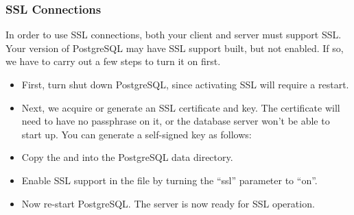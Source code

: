 \documentclass[a4paper,11pt,english]{sphinxmanual}
\begin{document}
\subsubsection{SSL Connections}
\label{\detokenize{maintenance:id1}}
In order to use SSL connections, both your client and server must support SSL. Your version of PostgreSQL may have SSL support built, but not enabled. If so, we have to carry out a few steps to turn it on first.
\begin{itemize}
\item {} 
First, turn shut down PostgreSQL, since activating SSL will require a restart.

\item {} 
Next, we acquire or generate an SSL certificate and key. The certificate will need to have no passphrase on it, or the database server won’t be able to start up. You can generate a self-signed key as follows:

\begin{sphinxVerbatim}[commandchars=\\\{\}]
     

     

         

  
\end{sphinxVerbatim}

\item {} 
Copy the  and  into the PostgreSQL data directory.

\item {} 
Enable SSL support in the  file by turning the “ssl” parameter to “on”.

\noindent{}

\item {} 
Now re-start PostgreSQL. The server is now ready for SSL operation.

\end{itemize}
\end{document}
